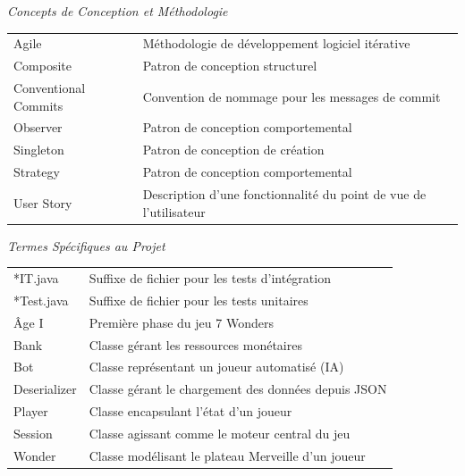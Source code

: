 \noindent 
\textit{Concepts de Conception et Méthodologie}

\vspace{6pt}

\noindent 
\begin{tabular}{@{}p{4cm}l}
	Agile&Méthodologie de développement logiciel itérative\\
	Composite&Patron de conception structurel\\
	Conventional Commits&Convention de nommage pour les messages de commit\\
	Observer&Patron de conception comportemental\\
	Singleton&Patron de conception de création\\
	Strategy&Patron de conception comportemental\\
	User Story&Description d'une fonctionnalité du point de vue de l'utilisateur\\
\end{tabular}

\vspace{18pt}

\noindent 
\textit{Termes Spécifiques au Projet}

\vspace{6pt}

\noindent 
\begin{tabular}{@{}p{4cm}l}
	*IT.java&Suffixe de fichier pour les tests d'intégration\\
	*Test.java&Suffixe de fichier pour les tests unitaires\\
	Âge I&Première phase du jeu 7 Wonders\\
	Bank&Classe gérant les ressources monétaires\\
	Bot&Classe représentant un joueur automatisé (IA)\\
	Deserializer&Classe gérant le chargement des données depuis JSON\\
	Player&Classe encapsulant l'état d'un joueur\\
	Session&Classe agissant comme le moteur central du jeu\\
	Wonder&Classe modélisant le plateau Merveille d'un joueur\\
\end{tabular}